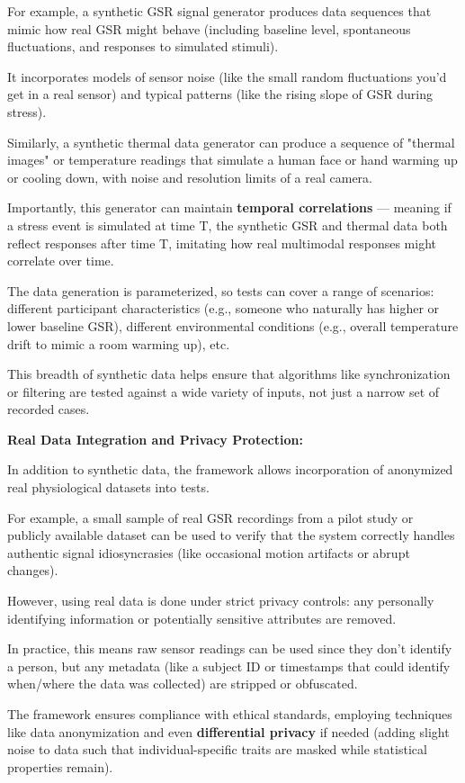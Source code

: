 {{For example, a synthetic GSR signal generator produces data sequences that mimic
how real GSR might behave (including baseline level, spontaneous fluctuations,
and responses to simulated stimuli).

It incorporates models of sensor noise (like the small random fluctuations you'd
get in a real sensor) and typical patterns (like the rising slope of GSR during
stress).

Similarly, a synthetic thermal data generator can produce a sequence of "thermal
images" or temperature readings that simulate a human face or hand warming up or
cooling down, with noise and resolution limits of a real camera.

Importantly, this generator can maintain \textbf{temporal correlations}
--- meaning if a stress event is simulated at time T, the synthetic GSR and
thermal data both reflect responses after time T, imitating how real multimodal
responses might correlate over time.

The data generation is parameterized, so tests can cover a range of scenarios:
different participant characteristics (e.g., someone who naturally has higher or
lower baseline GSR), different environmental conditions (e.g., overall
temperature drift to mimic a room warming up), etc.

This breadth of synthetic data helps ensure that algorithms like synchronization
or filtering are tested against a wide variety of inputs, not just a narrow set
of recorded cases.

\textbf{Real Data Integration and Privacy Protection:}

In addition to synthetic data, the framework allows incorporation of anonymized
real physiological datasets into tests.

For example, a small sample of real GSR recordings from a pilot study or
publicly available dataset can be used to verify that the system correctly
handles authentic signal idiosyncrasies (like occasional motion artifacts or
abrupt changes).

However, using real data is done under strict privacy controls: any personally
identifying information or potentially sensitive attributes are removed.

In practice, this means raw sensor readings can be used since they don't
identify a person, but any metadata (like a subject ID or timestamps that could
identify when/where the data was collected) are stripped or obfuscated.

The framework ensures compliance with ethical standards, employing techniques like data anonymization and even \textbf{differential privacy}
if needed (adding slight noise to data such that individual-specific traits are
masked while statistical properties remain).

}}
